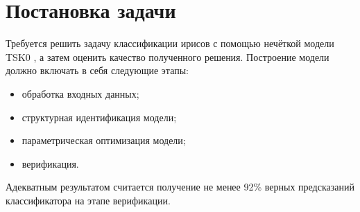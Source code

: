 \section{Постановка задачи}
Требуется решить задачу классификации ирисов \cite{irisDataset} с помощью нечёткой
модели TSK0 \cite{neuralNetworks}, а затем оценить качество полученного решения.
Построение модели должно включать в себя следующие этапы:
\begin{itemize}
  \item обработка входных данных;
  \item структурная идентификация модели;
  \item параметрическая оптимизация модели;
  \item верификация.
\end{itemize}
\par
Адекватным результатом считается получение не менее 92\% верных предсказаний
классификатора на этапе верификации.

